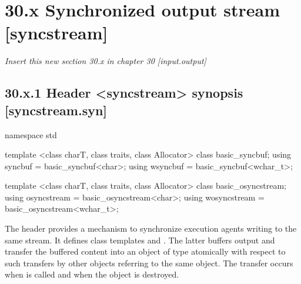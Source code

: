 \documentclass[ebook,11pt,article]{memoir}
\begin{document}
\section{30.x Synchronized output stream [syncstream]}
\emph{Insert this new section 30.x in chapter 30 [input.output] }
\subsection{30.x.1 Header <syncstream> synopsis [syncstream.syn]}
\begin{addedblock}
\begin{codeblock}
namespace std {
template <class charT,
          class traits,
          class Allocator>
  class basic_syncbuf;
using syncbuf  = basic_syncbuf<char>;
using wsyncbuf = basic_syncbuf<wchar_t>;

template <class charT,
          class traits,
          class Allocator>
  class basic_osyncstream;
using osyncstream = basic_osyncstream<char>;
using wosyncstream = basic_osyncstream<wchar_t>; 
}
\end{codeblock}
\end{addedblock}

\begin{addedblock}
\pnum
The header  provides a mechanism to synchronize execution agents writing to the same stream. 
It defines class templates  and . The latter buffers output and transfer the buffered content into an object of type  atomically with respect to such transfers by other  objects referring to the same  object. The transfer occurs when  is called and when the  object is destroyed.


\end{addedblock}
\end{document}
